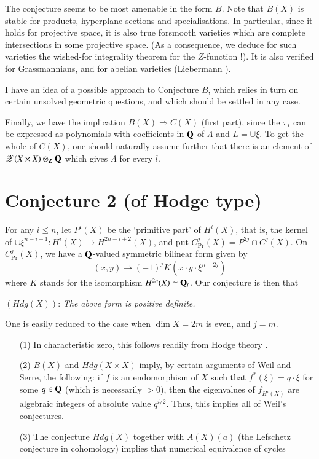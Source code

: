The conjecture seems to be most amenable in the form $B$. Note that $B(X)$ is stable for products, hyperplane sections and specialisations. In particular, since it holds for projective space, it is also true for\pageoriginale smooth varieties which are complete intersections in some projective space. (As a consequence, we deduce for such varieties the wished-for integrality theorem for the $Z$-function !). It is also verified for Grassmannians, and for abelian varieties (Liebermann \cite{art09-key3}).

I have an idea of a possible approach to Conjecture $B$, which relies in turn on certain unsolved geometric questions, and which should be settled in any case.

Finally, we have the implication $B(X)\Rightarrow C(X)$ (first part), since the $\pi_{i}$ can be expressed as polynomials with coefficients in $\mathbf{Q}$ of $\Lambda$ and $L=\cup \xi$. To get the whole of $C(X)$, one should naturally assume further that there is an element of $\mathscr{Z}(X\times X)\otimes_{\mathbf{Z}}\mathbf{Q}$ which gives $\Lambda$ for every $l$.

\section{Conjecture 2 (of Hodge type)}\label{art09-sec4}

For any $i\leq n$, let $P^{i}(X)$ be the `primitive part' of $H^{i}(X)$, that is, the kernel of $\cup \xi^{n-i+1}:H^{i}(X)\to H^{2n-i+2}(X)$, and put $C^{j}_{\Pr}(X)=P^{2j}\cap C^{j}(X)$. On $C^{j}_{\Pr}(X)$, we have a $\mathbf{Q}$-valued symmetric bilinear form given by
$$
(x,y)\to (-1)^{j}K(x\cdot y\cdot \xi^{n-2j})
$$
where $K$ stands for the isomorphism $H^{2n}(X)\simeq \mathbf{Q}_{l}$. Our conjecture is then that

$(Hdg(X))$: {\em The above form is positive definite.}

One is easily reduced to the case when $\dim X=2m$ is even, and $j=m$.

\begin{remarks*}
\begin{itemize}
\item[(1)] In characteristic zero, this follows readily from Hodge theory \cite{art09-key5}.

\item[(2)] $B(X)$ and $Hdg(X\times X)$ imply, by certain arguments of Weil and Serre, the following: if $f$ is an endomorphism of $X$ such that $f^{*}(\xi)=q\cdot \xi$ for some $q\in \mathbf{Q}$ (which is necessarily $>0$), then the eigenvalues of $f_{H^{i}(X)}$ are algebraic integers of absolute value $q^{i/2}$. Thus, this implies all of Weil's conjectures.

\item[(3)] The conjecture $Hdg(X)$ together with $A(X)(a)$ (the Lefschetz conjecture in cohomology) implies that numerical equivalence of cycles\pageoriginale 
\end{itemize}
\end{remarks*}
